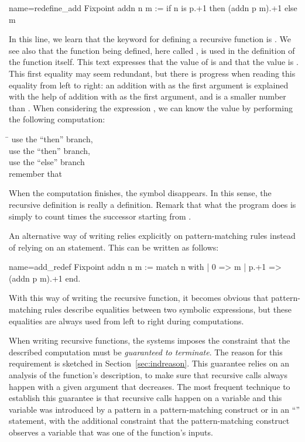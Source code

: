 \begin{coq}{name=redefine_add}{}
Fixpoint addn n m :=
  if n is p.+1 then (addn p m).+1 else m
\end{coq}
In this line, we learn that the keyword for defining a recursive
function is .  We see also that the function being
defined, here called , is used in the definition of the
function  itself.  This text expresses that the value of
 is
 and that the value  is .
This first equality may
seem redundant, but there is progress when reading this equality from
left to right: an addition with  as the first argument
is explained with the help of addition with  as the first
argument, and  is a smaller number than .  When considering the
expression , we can know the value by performing the following
computation:
\begin{tabbing}
\=\kill
{} \> use the ``then'' branch, \\
 \> use the ``then'' branch, \\
 \> use the ``else'' branch\\
\> remember that 
\end{tabbing}
When the computation finishes, the symbol  disappears.  In
this sense, the recursive definition is really a definition.  Remark that
what the  program does is simply to count  times the
successor starting from .

An alternative way of writing  relies explicitly on
pattern-matching rules instead of relying on an  statement.
This can be written as follows:

\begin{coq}{name=add_redef}{}
Fixpoint addn n m :=
  match n with
  | 0 => m
  | p.+1 => (addn p m).+1
  end.
\end{coq}
With this way of writing the recursive function, it becomes obvious that
pattern-matching rules describe equalities between two symbolic
expressions, but these equalities are always used from left to right during
computations.

When writing recursive functions, the \Coq{} systems imposes the
constraint that the described computation must be \emph{guaranteed to
terminate}.  The reason for this requirement is sketched in
Section~\ref{sec:indreason}.
This guarantee relies on an analysis of the function's
description, to make sure that recursive calls always happen with a
given argument that decreases.  The most frequent technique to
establish this guarantee is that recursive calls happen on a variable
and this variable was introduced by a pattern in a pattern-matching
construct or in an ``'' statement, with the additional
constraint that the pattern-matching construct observes a variable
that was one of the function's inputs.

